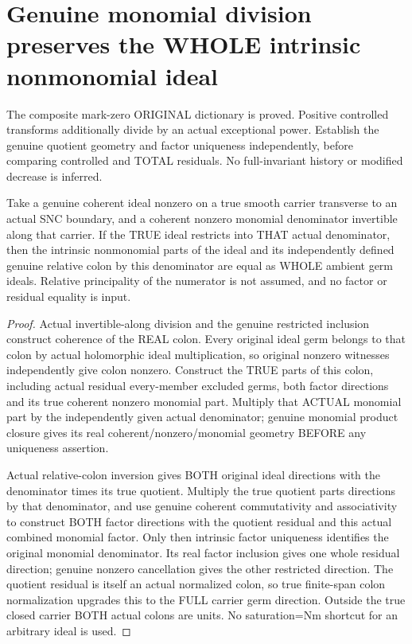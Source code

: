 \section{Genuine monomial division preserves the WHOLE intrinsic nonmonomial ideal}

The composite mark-zero ORIGINAL dictionary is proved. Positive controlled
transforms additionally divide by an actual exceptional power. Establish
the genuine quotient geometry and factor uniqueness independently, before
comparing controlled and TOTAL residuals. No full-invariant history or
modified decrease is inferred.

\begin{theorem}
\label{hir:sharp-actual-monomial-division-whole-nonmonomial-invariance}
\leanok
Take a genuine coherent ideal nonzero on a true smooth carrier transverse
to an actual SNC boundary, and a coherent nonzero monomial denominator
invertible along that carrier. If the TRUE ideal restricts into THAT
actual denominator, then the intrinsic nonmonomial parts of the ideal
and its independently defined genuine relative colon by this denominator
are equal as WHOLE ambient germ ideals. Relative principality of the
numerator is not assumed, and no factor or residual equality is input.
\end{theorem}
\begin{proof}
Actual invertible-along division and the genuine restricted inclusion
construct coherence of the REAL colon. Every original ideal germ belongs
to that colon by actual holomorphic ideal multiplication, so original
nonzero witnesses independently give colon nonzero. Construct the TRUE
parts of this colon, including actual residual every-member excluded
germs, both factor directions and its true coherent nonzero monomial
part. Multiply that ACTUAL monomial part by the independently given
actual denominator; genuine monomial product closure gives its real
coherent/nonzero/monomial geometry BEFORE any uniqueness assertion.

Actual relative-colon inversion gives BOTH original ideal directions with
the denominator times its true quotient. Multiply the true quotient parts
directions by that denominator, and use genuine coherent commutativity
and associativity to construct BOTH factor directions with the quotient
residual and this actual combined monomial factor. Only then intrinsic
factor uniqueness identifies the original monomial denominator. Its real
factor inclusion gives one whole residual direction; genuine nonzero
cancellation gives the other restricted direction. The quotient residual
is itself an actual normalized colon, so true finite-span colon
normalization upgrades this to the FULL carrier germ direction. Outside
the true closed carrier BOTH actual colons are units. No saturation=Nm
shortcut for an arbitrary ideal is used.
\end{proof}

